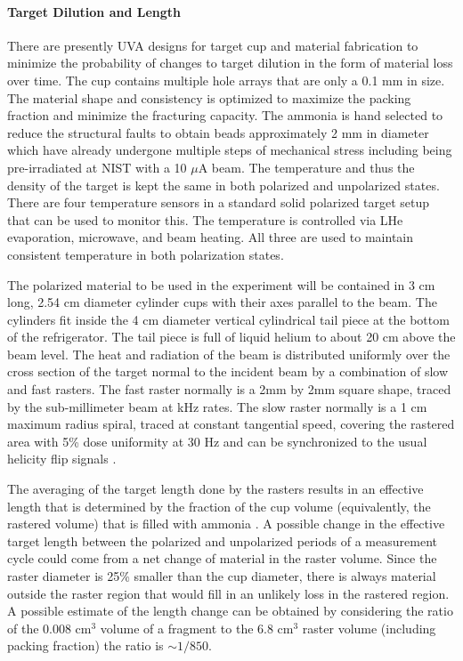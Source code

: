 \paragraph{ Target Dilution and Length }

There are presently UVA designs for target cup and material fabrication to minimize the probability
of changes to target dilution in the form of material loss over time.  The cup contains
multiple hole arrays that are only a 0.1 mm in size.  The material shape and consistency 
is optimized to maximize the packing fraction and minimize the fracturing capacity.  The
ammonia is hand selected to reduce the structural faults to obtain beads approximately 
2 mm in diameter which have already undergone multiple steps of mechanical stress including being pre-irradiated at NIST with a 10 $\mu$A beam.  The temperature
and thus the density of the target is kept the same
in both polarized and unpolarized states.  There are four temperature sensors in a
standard solid polarized target setup that can be used to monitor this.  The temperature
is controlled via LHe evaporation, microwave, and beam heating.  All three are used
to maintain consistent temperature in both polarization states.

The polarized material to be used in the experiment will be contained in 3 cm 
long, 2.54 cm diameter cylinder cups with their axes parallel to the beam.
The cylinders fit inside the 4 cm diameter vertical cylindrical tail piece at 
the bottom of the refrigerator.  The tail piece is full of liquid helium to 
about 20 cm above the beam level.  The heat and radiation of the beam is distributed
uniformly over the cross section of the target normal to the incident beam by a combination
of slow and fast rasters. The fast raster normally is a 2mm by 2mm square shape, traced by the 
sub-millimeter beam at kHz rates.  The slow raster normally is a 1 cm maximum radius spiral, traced at constant tangential speed, covering the rastered area with 5\% dose uniformity at 30 Hz
and can be synchronized to the usual helicity flip signals \cite{chenyan}.

The averaging of the target length done by the rasters results in an effective 
length that is determined by the fraction of the cup volume 
(equivalently, the rastered volume) that is filled with ammonia \cite{chenyan}.
A possible change in the effective target length between the polarized and 
unpolarized periods of a measurement cycle could come from a net change of 
material in the raster volume. Since the raster diameter is 25\% smaller than 
the cup diameter, there is always material outside the raster region that would
fill in an unlikely loss in the rastered region.
A possible estimate of the length change can be obtained by considering the 
ratio of the 0.008 cm$^3$ volume of a fragment to the 6.8 cm$^3$ raster volume 
(including packing fraction) the ratio is $\sim 1/850$.


